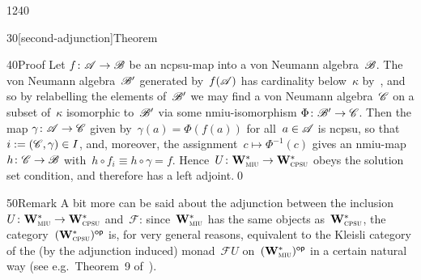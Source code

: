 \begin{parsec}{1240}
\begin{point}{30}[second-adjunction]{Theorem}
\begin{point}{40}{Proof}
Let $f\colon \mathscr{A}\to\mathscr{B}$
be an ncpsu-map
into a von Neumann algebra~$\mathscr{B}$.
The von Neumann algebra~$\mathscr{B}'$ generated by~$f(\mathscr{A})$
has cardinality below~$\kappa$
by~,
and so by relabelling the elements of~$\mathscr{B}'$
we may find a von Neumann algebra~$\mathscr{C}$
on a subset of~$\kappa$
isomorphic to~$\mathscr{B}'$
via some nmiu-isomorphism $\Phi\colon \mathscr{B}'\to\mathscr{C}$.
Then the map $\gamma\colon \mathscr{A}\to \mathscr{C}$
given by~$\gamma(a)=\Phi(f(a))$ for all~$a\in\mathscr{A}$
is ncpsu,
so that~$i:=(\mathscr{C},\gamma)\in I$,
and, moreover,
the assignment~$c\mapsto \Phi^{-1}(c)$
gives an nmiu-map $h\colon \mathscr{C}\to \mathscr{B}$
with~$h\circ f_i \equiv h\circ \gamma=f$.
Hence~$U\colon \mathbf{W}^*_{\text{\textsc{miu}}}\to\mathbf{W}^*_{\text{\textsc{cpsu}}}$
obeys the solution set condition,
and therefore has a left adjoint.\qed
\end{point}
\begin{point}{50}{Remark}%
A bit more can be said
about the adjunction between the inclusion~$U\colon \mathbf{W}^*_{\text{\textsc{miu}}}\to\mathbf{W}^*_{\text{\textsc{cpsu}}}$
and~$\mathcal{F}$:
since~$\mathbf{W}^*_{\text{\textsc{miu}}}$ has the same objects as~$\mathbf{W}^*_{\text{\textsc{cpsu}}}$,
the category~${(\mathbf{W}^*_{\text{\textsc{cpsu}}})}{^{\mathsf{op}}}$
is, for very general reasons, equivalent
to the Kleisli category
	of the (by the adjunction induced) monad~$\mathcal{F}U$ 
on~${(\mathbf{W}^*_{\text{\textsc{miu}}})}{^{\mathsf{op}}}$
in a certain natural way
(see e.g.~Theorem~9 of~\cite{qpakm}).
\end{point}
\end{point}
\end{parsec}
